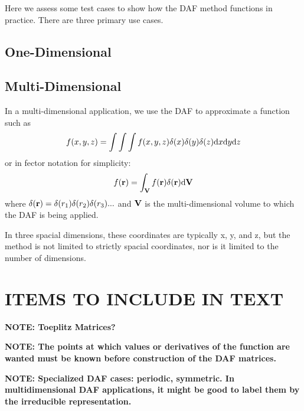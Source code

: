 \documentclass[preprint]{revtex4}
\begin{document}
Here we assess some test cases to show how the DAF method functions in practice. 
There are three primary use cases. 


\subsection{One-Dimensional}

\subsection{Multi-Dimensional}
In a multi-dimensional application, we use the DAF to approximate a function such as
\begin{equation}
f(x,y,z) = \int\int\int f(x,y,z)\delta(x)\delta(y)\delta(z) {\rm d}x {\rm d}y {\rm d}z
\end{equation}
or in fector notation for simplicity: 
\begin{equation}
f({\bf r}) = \int_{\bf V} f({\bf r})\delta({\bf r}){\rm d}{\bf V}
\end{equation}
where $\delta({\bf r}) = \delta(r_1)\delta(r_2)\delta(r_3)...$ and ${\bf V}$ is the
multi-dimensional volume to which the DAF is being applied. 

In three spacial dimensions, these coordinates are typically x, y, and z, but the method is
not limited to strictly spacial coordinates, nor is it limited to the number of
dimensions. 



\section{ITEMS TO INCLUDE IN TEXT}
{\bf NOTE: Toeplitz Matrices?}

{\bf NOTE: The points at which values or derivatives of the function are wanted must be known
before construction of the DAF matrices. }

{\bf NOTE: Specialized DAF cases: periodic, symmetric. In multidimensional DAF applications, 
it might be good to label them by the irreducible representation.}

\appendix






\end{document}
